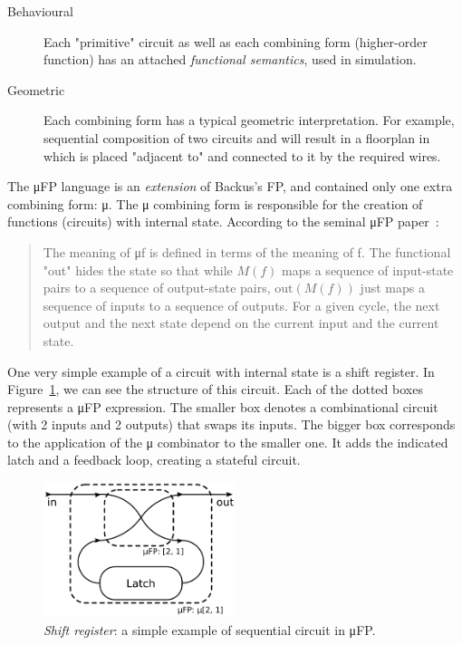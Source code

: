        \begin{description}
            \item[Behavioural]
                Each "primitive" circuit as well as each combining form (higher-order function)
                has an attached \emph{functional semantics}, used in simulation.
            \item[Geometric]
                Each combining form has a typical geometric interpretation.
                For example, sequential composition of two circuits  and  will result
                in a floorplan in which  is placed "adjacent to"  and connected to it
                by the required wires.
        \end{description}

        The μFP language is an \emph{extension} of Backus's FP, and contained only one extra combining form: μ.
        The μ combining form is responsible for the creation of functions (circuits) with internal state.
        According to the seminal μFP paper~\cite{mufp-1984}:

        \begin{quote}
            The meaning of μf is defined in terms of the meaning of f.
            The functional "out" hides the state
            so that while $M(f)$ maps a sequence of input-state pairs to a sequence of output-state pairs,
            $\text{out}(M(f))$ just maps a sequence of inputs to a sequence of outputs.
            For a given cycle, the next output and the next state depend on the current input and the current state.
        \end{quote}

        One very simple example of a circuit with internal state is a shift register.
        In Figure~\ref{fig:mufp-shift}, we can see the structure of this circuit.
        Each of the dotted boxes represents a μFP expression.
        The smaller box denotes a combinational circuit (with 2 inputs and 2 outputs) that swaps its inputs.
        The bigger box corresponds to the application of the μ combinator to the smaller one.
        It adds the indicated latch and a feedback loop, creating a stateful circuit.

        \begin{figure}[h]
            \centerline{\includegraphics[width=0.5\textwidth]{imgs/mufp-shift.pdf}}
            \caption{\emph{Shift register}: a simple example of sequential circuit in μFP. \label{fig:mufp-shift}}
        \end{figure}

